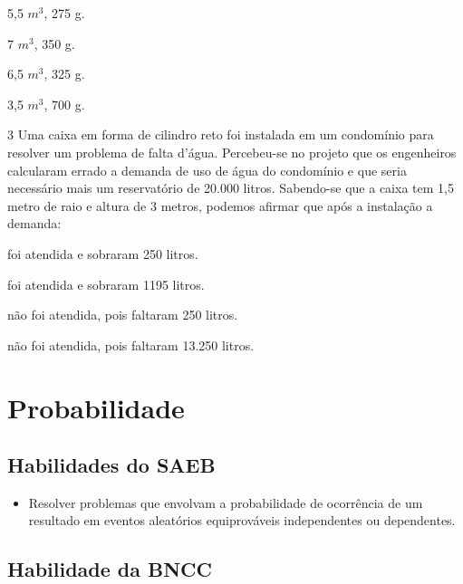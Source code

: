 \begin{escolha}

  \item 5,5 $m^3$, 275 g.

  \item 7 $m^3$, 350 g.

  \item 6,5 $m^3$, 325 g.

  \item 3,5 $m^3$, 700 g.

\end{escolha}


\num{3} Uma caixa em forma de cilindro reto foi instalada em um condomínio
para resolver um problema de falta d'água. Percebeu-se no projeto que os
engenheiros calcularam errado a demanda de uso de água do condomínio e
que seria necessário mais um reservatório de 20.000 litros. Sabendo-se
que a caixa tem 1,5 metro de raio e altura de 3 metros, podemos afirmar
que após a instalação a demanda:

\begin{escolha}
  \item foi atendida e sobraram 250 litros.

  \item foi atendida e sobraram 1195 litros.

  \item não foi atendida, pois faltaram 250 litros.

  \item não foi atendida, pois faltaram 13.250 litros.
\end{escolha}


\chapter{Probabilidade}

\section{Habilidades do SAEB}

\begin{itemize}

  \item Resolver problemas que envolvam a probabilidade de ocorrência de um
resultado em eventos aleatórios equiprováveis independentes ou
dependentes.   

\end{itemize}

\section*{Habilidade da BNCC}

